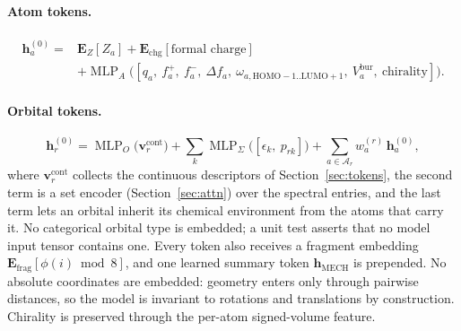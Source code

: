 \documentclass[11pt,a4paper]{article}
\newcommand{\vb}[1]{\bm{#1}}
\newcommand{\MLP}{\operatorname{MLP}}
\begin{document}
\paragraph{Atom tokens.}
\begin{equation}
\begin{split}
\vb{h}^{(0)}_a={}&\vb{E}_Z[Z_a]+\vb{E}_{\mathrm{chg}}[\text{formal charge}]\\
&+\MLP_A\big([q_a,\ f^+_a,\ f^-_a,\ \Delta f_a,\ \omega_{a,\mathrm{HOMO-1..LUMO+1}},\ V^{\mathrm{bur}}_a,\ \text{chirality}]\big).
\end{split}
\end{equation}
\paragraph{Orbital tokens.}
\begin{equation}
\vb{h}^{(0)}_r=\MLP_O\big(\vb{v}^{\mathrm{cont}}_r\big)+\sum_{k}\MLP_{\Sigma}\big([\epsilon_k,\ p_{rk}]\big)+\sum_{a\in\mathcal{A}_r} w^{(r)}_a\,\vb{h}^{(0)}_a ,
\end{equation}
where $\vb{v}^{\mathrm{cont}}_r$ collects the continuous descriptors of Section~\ref{sec:tokens}, the second term is a set encoder (Section~\ref{sec:attn}) over the spectral entries, and the last term lets an orbital inherit its chemical environment from the atoms that carry it. No categorical orbital type is embedded; a unit test asserts that no model input tensor contains one. Every token also receives a fragment embedding $\vb{E}_{\mathrm{frag}}[\phi(i)\bmod 8]$, and one learned summary token $\vb{h}_{\mathrm{MECH}}$ is prepended. No absolute coordinates are embedded: geometry enters only through pairwise distances, so the model is invariant to rotations and translations by construction. Chirality is preserved through the per-atom signed-volume feature.
\end{document}
